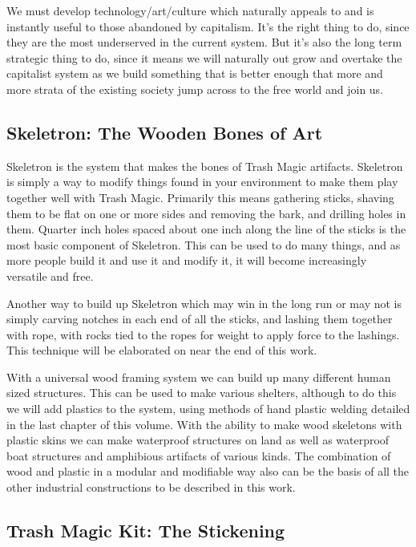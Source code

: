 We must develop technology/art/culture which naturally appeals to and is
instantly useful to those abandoned by capitalism. It's the right thing
to do, since they are the most underserved in the current system. But
it's also the long term strategic thing to do, since it means we will
naturally out grow and overtake the capitalist system as we build
something that is better enough that more and more strata of the
existing society jump across to the free world and join us.

\subsection{Skeletron: The Wooden Bones of
Art}\label{skeletron-the-wooden-bones-of-art}

Skeletron is the system that makes the bones of Trash Magic artifacts.
Skeletron is simply a way to modify things found in your environment to
make them play together well with Trash Magic. Primarily this means
gathering sticks, shaving them to be flat on one or more sides and
removing the bark, and drilling holes in them. Quarter inch holes spaced
about one inch along the line of the sticks is the most basic component
of Skeletron. This can be used to do many things, and as more people
build it and use it and modify it, it will become increasingly versatile
and free.

Another way to build up Skeletron which may win in the long run or may
not is simply carving notches in each end of all the sticks, and lashing
them together with rope, with rocks tied to the ropes for weight to
apply force to the lashings. This technique will be elaborated on near
the end of this work.

With a universal wood framing system we can build up many different
human sized structures. This can be used to make various shelters,
although to do this we will add plastics to the system, using methods of
hand plastic welding detailed in the last chapter of this volume. With
the ability to make wood skeletons with plastic skins we can make
waterproof structures on land as well as waterproof boat structures and
amphibious artifacts of various kinds. The combination of wood and
plastic in a modular and modifiable way also can be the basis of all the
other industrial constructions to be described in this work.

\subsection{Trash Magic Kit: The
Stickening}\label{trash-magic-kit-the-stickening}

